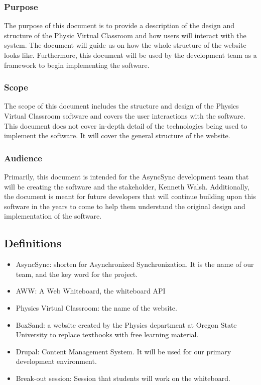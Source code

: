\documentclass[10pt]{article}
\begin{document}
        \subsubsection{Purpose}
           The purpose of this document is to provide a description of the design and structure of the Physic Virtual Classroom and how users will interact with the system. The document will guide us on how the whole structure of the website looks like. Furthermore, this document will be used by the development team as a framework to begin implementing the software.

        \subsubsection{Scope}
            The scope of this document includes the structure and design of the Physics Virtual Classroom software and covers the user interactions with the software. This document does not cover in-depth detail of the technologies being used to implement the software. It will cover the general structure of the website.

        \subsubsection{Audience}
            Primarily, this document is intended for the AsyncSync development team that will be creating the software and the stakeholder, Kenneth Walsh. Additionally, the document is meant for future developers that will continue building upon this software in the years to come to help them understand the original design and implementation of the software.

    \subsection{Definitions}
        \begin{itemize}
            \item AsyncSync: shorten for Asynchronized Synchronization. It is the name of our team, and the key word for the project.
            \item AWW: A Web Whiteboard, the whiteboard API
            \item Physics Virtual Classroom: the name of the website.
            \item BoxSand: a website created by the Physics department at Oregon State University to replace textbooks with free learning material.
            \item Drupal: Content Management System. It will be used for our primary development environment.
            \item Break-out session: Session that students will work on the whiteboard.
        \end{itemize}
\newpage
\end{document}
